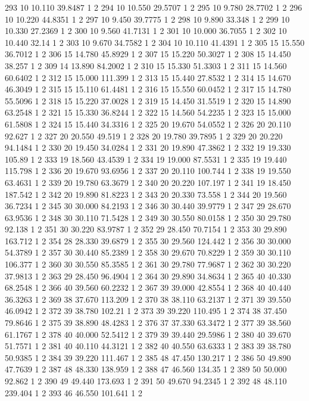 {293 10 10.110 39.8487 1 2
294 10 10.550 29.5707 1 2
295 10 9.780 28.7702 1 2
296 10 10.220 44.8351 1 2
297 10 9.450 39.7775 1 2
298 10 9.890 33.348 1 2
299 10 10.330 27.2369 1 2
300 10 9.560 41.7131 1 2
301 10 10.000 36.7055 1 2
302 10 10.440 32.14 1 2
303 10 9.670 34.7582 1 2
304 10 10.110 41.4391 1 2
305 15 15.550 36.7012 1 2
306 15 14.780 45.8929 1 2
307 15 15.220 50.3027 1 2
308 15 14.450 38.257 1 2
309 14 13.890 84.2002 1 2
310 15 15.330 51.3303 1 2
311 15 14.560 60.6402 1 2
312 15 15.000 111.399 1 2
313 15 15.440 27.8532 1 2
314 15 14.670 46.3049 1 2
315 15 15.110 61.4481 1 2
316 15 15.550 60.0452 1 2
317 15 14.780 55.5096 1 2
318 15 15.220 37.0028 1 2
319 15 14.450 31.5519 1 2
320 15 14.890 63.2548 1 2
321 15 15.330 36.8244 1 2
322 15 14.560 54.2235 1 2
323 15 15.000 61.5808 1 2
324 15 15.440 34.3316 1 2
325 20 19.670 54.0552 1 2
326 20 20.110 92.627 1 2
327 20 20.550 49.519 1 2
328 20 19.780 39.7895 1 2
329 20 20.220 94.1484 1 2
330 20 19.450 34.0284 1 2
331 20 19.890 47.3862 1 2
332 19 19.330 105.89 1 2
333 19 18.560 43.4539 1 2
334 19 19.000 87.5531 1 2
335 19 19.440 115.798 1 2
336 20 19.670 93.6956 1 2
337 20 20.110 100.744 1 2
338 19 19.550 63.4631 1 2
339 20 19.780 63.3679 1 2
340 20 20.220 107.197 1 2
341 19 18.450 187.542 1 2
342 20 19.890 81.8223 1 2
343 20 20.330 73.558 1 2
344 20 19.560 36.7234 1 2
345 30 30.000 84.2193 1 2
346 30 30.440 39.9779 1 2
347 29 28.670 63.9536 1 2
348 30 30.110 71.5428 1 2
349 30 30.550 80.0158 1 2
350 30 29.780 92.138 1 2
351 30 30.220 83.9787 1 2
352 29 28.450 70.7154 1 2
353 30 29.890 163.712 1 2
354 28 28.330 39.6879 1 2
355 30 29.560 124.442 1 2
356 30 30.000 54.3789 1 2
357 30 30.440 85.2389 1 2
358 30 29.670 70.8229 1 2
359 30 30.110 106.377 1 2
360 30 30.550 85.3585 1 2
361 30 29.780 77.9687 1 2
362 30 30.220 37.9813 1 2
363 29 28.450 96.4904 1 2
364 30 29.890 34.8634 1 2
365 40 40.330 68.2548 1 2
366 40 39.560 60.2232 1 2
367 39 39.000 42.8554 1 2
368 40 40.440 36.3263 1 2
369 38 37.670 113.209 1 2
370 38 38.110 63.2137 1 2
371 39 39.550 46.0942 1 2
372 39 38.780 102.21 1 2
373 39 39.220 110.495 1 2
374 38 37.450 79.8646 1 2
375 39 38.890 48.4283 1 2
376 37 37.330 63.3472 1 2
377 39 38.560 61.1767 1 2
378 40 40.000 52.5412 1 2
379 39 39.440 29.5986 1 2
380 40 39.670 51.7571 1 2
381 40 40.110 44.3121 1 2
382 40 40.550 63.6333 1 2
383 39 38.780 50.9385 1 2
384 39 39.220 111.467 1 2
385 48 47.450 130.217 1 2
386 50 49.890 47.7639 1 2
387 48 48.330 138.959 1 2
388 47 46.560 134.35 1 2
389 50 50.000 92.862 1 2
390 49 49.440 173.693 1 2
391 50 49.670 94.2345 1 2
392 48 48.110 239.404 1 2
393 46 46.550 101.641 1 2
}
